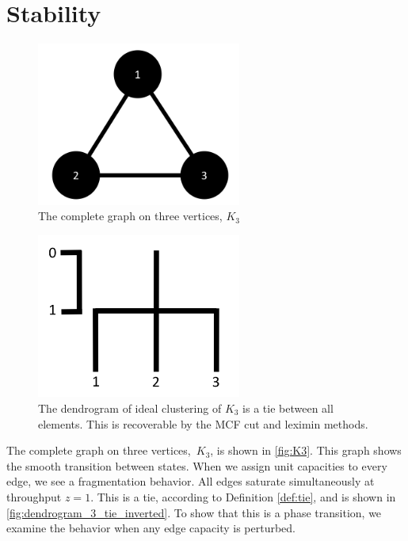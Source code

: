 \section{Stability}

\begin{figure}
\centering
\includegraphics[width=0.6\textwidth]{fig/K3}
\caption{The complete graph on three vertices, $K_3$}
\label{fig:K3}
\end{figure}

\begin{figure}
\centering
\includegraphics[width=0.6\textwidth]{fig/dendrogram_3_tie_inverted}
\caption{The dendrogram of ideal clustering of $K_3$ is a tie between all elements. This is recoverable by the MCF cut and leximin methods.}
\label{fig:dendrogram_3_tie_inverted}
\end{figure}


The complete graph on three vertices,~$K_3$, is shown in \autoref{fig:K3}. This graph shows the smooth transition between states. When we assign unit capacities to every edge, we see a fragmentation behavior. All edges saturate simultaneously at throughput $z=1$. This is a tie, according to Definition \autoref{def:tie}, and is shown in \autoref{fig:dendrogram_3_tie_inverted}. To show that this is a phase transition, we examine the behavior when any edge capacity is perturbed.

